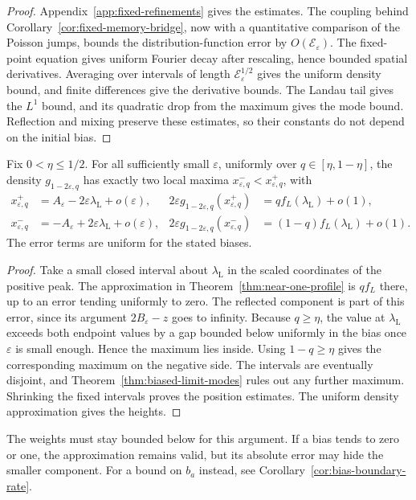 \begin{proof}
Appendix~\ref{app:fixed-refinements} gives the estimates. The coupling
behind Corollary~\ref{cor:fixed-memory-bridge}, now with a quantitative
comparison of the Poisson jumps, bounds the distribution-function error
by $O(\mathcal E_\varepsilon)$. The fixed-point equation gives uniform
Fourier decay after rescaling, hence bounded spatial derivatives.
Averaging over intervals of length $\mathcal E_\varepsilon^{1/2}$
gives the uniform density bound, and finite differences give the
derivative bounds.
The Landau tail gives the $L^1$ bound, and its quadratic drop from the
maximum gives the mode bound. Reflection and mixing preserve these
estimates, so their constants do not depend on the initial bias.
\end{proof}

\begin{corollary}\label{cor:biased-near-one-peaks}
Fix $0<\eta\le1/2$. For all sufficiently small $\varepsilon$, uniformly
over $q\in[\eta,1-\eta]$, the density $g_{1-2\varepsilon,q}$ has exactly
two local maxima $x^-_{\varepsilon,q}<x^+_{\varepsilon,q}$, with
\[
 \begin{aligned}
 x^+_{\varepsilon,q}&=A_\varepsilon-2\varepsilon\lambda_{\mathrm L}
                         +o(\varepsilon),&
 2\varepsilon g_{1-2\varepsilon,q}(x^+_{\varepsilon,q})
                         &=q f_L(\lambda_{\mathrm L})+o(1),\\
 x^-_{\varepsilon,q}&=-A_\varepsilon+2\varepsilon\lambda_{\mathrm L}
                         +o(\varepsilon),&
 2\varepsilon g_{1-2\varepsilon,q}(x^-_{\varepsilon,q})
                         &=(1-q) f_L(\lambda_{\mathrm L})+o(1).
 \end{aligned}
\]
The error terms are uniform for the stated biases.
\end{corollary}

\begin{proof}
Take a small closed interval about $\lambda_{\mathrm L}$ in the
scaled coordinates of the positive peak. The approximation in
Theorem~\ref{thm:near-one-profile} is $qf_L$ there, up to an error
tending uniformly to zero. The reflected component is part of this
error, since its argument $2B_\varepsilon-z$ goes to infinity.
Because $q\ge\eta$, the value at $\lambda_{\mathrm L}$ exceeds
both endpoint values by a gap bounded below uniformly in the bias
once $\varepsilon$ is small enough. Hence the maximum lies inside.
Using $1-q\ge\eta$ gives the corresponding maximum on the negative
side. The intervals are eventually disjoint, and
Theorem~\ref{thm:biased-limit-modes} rules out any further maximum.
Shrinking the fixed intervals proves the position estimates.
The uniform density approximation gives the heights.
\end{proof}

The weights must stay bounded below for this argument. If a bias
tends to zero or one, the approximation remains valid, but its absolute
error may hide the smaller component. For a bound on $b_a$ instead,
see Corollary~\ref{cor:bias-boundary-rate}.
